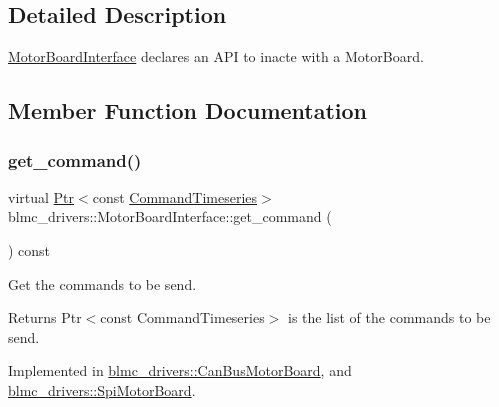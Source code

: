 \subsection{Detailed Description}
\hyperlink{classblmc__drivers_1_1MotorBoardInterface}{Motor\+Board\+Interface} declares an A\+PI to inacte with a Motor\+Board. 

\subsection{Member Function Documentation}
\mbox{\label{classblmc__drivers_1_1MotorBoardInterface_a4913308c1eacc98475aeb8647447c997}} 
\subsubsection{\texorpdfstring{get\+\_\+command()}{get\_command()}}
{\footnotesize\ttfamily virtual \hyperlink{classblmc__drivers_1_1MotorBoardInterface_a6a733b7ed7a3a96f6b0712b6bb5307f8}{Ptr}$<$const \hyperlink{classblmc__drivers_1_1MotorBoardInterface_ae2afe94a023d9f08a4c689e9b7660f15}{Command\+Timeseries}$>$ blmc\+\_\+drivers\+::\+Motor\+Board\+Interface\+::get\+\_\+command (\begin{DoxyParamCaption}{ }\end{DoxyParamCaption}) const\hspace{0.3cm}{\ttfamily [pure virtual]}}



Get the commands to be send. 

\begin{DoxyReturn}{Returns}
Ptr$<$const Command\+Timeseries$>$ is the list of the commands to be send. 
\end{DoxyReturn}


Implemented in \hyperlink{classblmc__drivers_1_1CanBusMotorBoard_ac7adb4e5074229bb38e1c288702321e4}{blmc\+\_\+drivers\+::\+Can\+Bus\+Motor\+Board}, and \hyperlink{classblmc__drivers_1_1SpiMotorBoard_ad8640595ac4c46af1847fd141946d640}{blmc\+\_\+drivers\+::\+Spi\+Motor\+Board}.

\mbox{\label{classblmc__drivers_1_1MotorBoardInterface_aa5eeed12c851993f2e2c93f5479df9de}} 
